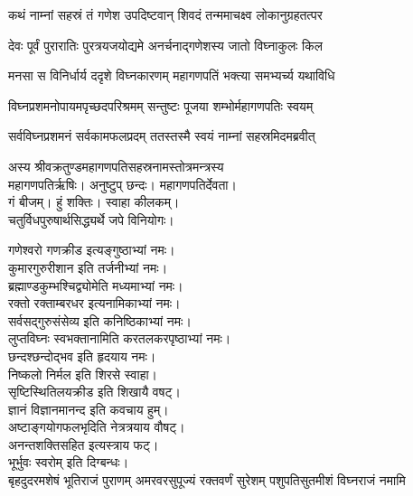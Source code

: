 

\twolineshloka
{कथं नाम्नां सहस्रं तं गणेश उपदिष्टवान्}
{शिवदं तन्ममाचक्ष्व लोकानुग्रहतत्पर}


\twolineshloka
{देवः पूर्वं पुरारातिः पुरत्रयजयोद्यमे}
{अनर्चनाद्गणेशस्य जातो विघ्नाकुलः किल}

\twolineshloka
{मनसा स विनिर्धार्य ददृशे विघ्नकारणम्}
{महागणपतिं भक्त्या समभ्यर्च्य यथाविधि}

\twolineshloka
{विघ्नप्रशमनोपायमपृच्छदपरिश्रमम्}
{सन्तुष्टः पूजया शम्भोर्महागणपतिः स्वयम्}

\twolineshloka
{सर्वविघ्नप्रशमनं सर्वकामफलप्रदम्}
{ततस्तस्मै स्वयं नाम्नां सहस्रमिदमब्रवीत्}

अस्य श्रीवक्रतुण्डमहागणपतिसहस्रनामस्तोत्रमन्त्रस्य\\
महागणपतिर्ऋषिः। अनुष्टुप् छन्दः। महागणपतिर्देवता।\\
गं बीजम्। हुं शक्तिः। स्वाहा कीलकम्।\\
चतुर्विधपुरुषार्थसिद्ध्यर्थे जपे विनियोगः।

{गणेश्वरो गणक्रीड इत्यङ्गुष्ठाभ्यां नमः।}\\
{कुमारगुरुरीशान इति तर्जनीभ्यां नमः।}\\
{ब्रह्माण्डकुम्भश्चिद्व्योमेति मध्यमाभ्यां नमः।}\\
{रक्तो रक्ताम्बरधर इत्यनामिकाभ्यां नमः।}\\
{सर्वसद्गुरुसंसेव्य इति कनिष्ठिकाभ्यां नमः।}\\
{लुप्तविघ्नः स्वभक्तानामिति करतलकरपृष्ठाभ्यां नमः।}\\


छन्दश्छन्दोद्भव इति हृदयाय नमः।\\
निष्कलो निर्मल इति शिरसे स्वाहा।\\
सृष्टिस्थितिलयक्रीड इति शिखायै वषट्।\\
ज्ञानं विज्ञानमानन्द इति कवचाय हुम्।\\
अष्टाङ्गयोगफलभृदिति नेत्रत्रयाय वौषट्।\\
अनन्तशक्तिसहित इत्यस्त्राय फट्।\\
भूर्भुवः स्वरोम् इति दिग्बन्धः।\\


{बृहदुदरमशेषं भूतिराजं पुराणम्}
{अमरवरसुपूज्यं रक्तवर्णं सुरेशम्}
{पशुपतिसुतमीशं विघ्नराजं नमामि}

